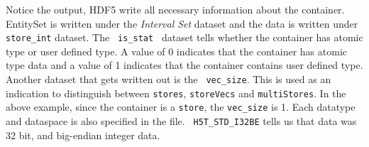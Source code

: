 \par Notice the output, HDF5 write all necessary information about the
container. EntitySet is written under the {\em Interval Set} dataset
and the data is written under {\tt store_int} dataset. The {\tt
  is\_stat } dataset tells whether the container has atomic type or
user defined type. A value of 0 indicates that the container has atomic 
type data and a value of 1 indicates that the container contains user
defined type. Another dataset that gets written out is the {\tt
  vec\_size}. This is used as an indication to distinguish between
{\tt stores}, {\tt storeVecs} and {\tt multiStores}. In the above
example, since the container is a {\tt store}, the {\tt vec\_size} is
1. Each datatype and dataspace is also specified in the file. {\tt
  H5T\_STD\_I32BE} tells us that data was 32 bit, and big-endian
integer data.   
%

